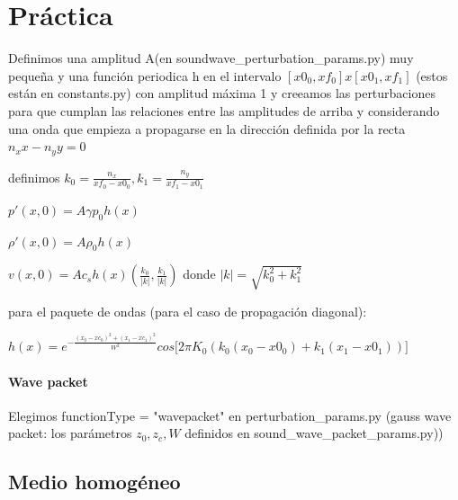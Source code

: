 \documentclass{article}
\begin{document}
\section{Práctica}
\begin{description}
\item Definimos una amplitud A(en soundwave\_perturbation\_params.py) muy pequeña y una función periodica h en el intervalo $[x0_0, xf_0] x [x0_1, xf_1]$ (estos están en constants.py) con amplitud máxima 1 y creeamos las perturbaciones para que cumplan las relaciones entre las amplitudes de arriba y considerando una onda que empieza a propagarse en la dirección definida por la recta $n_x x - n_y y = 0$
\item definimos $ k_0 = \frac{n_x}{xf_0 - x0_0}, k_1 =  \frac{n_y}{xf_1 - x0_1}$ 
\item  $p\prime(x,0) = A \gamma p_0 h(x) $ 
\item  $\rho\prime(x,0) = A \rho_0 h(x) $
\item  $v(x, 0) =  A c_s h(x) (\frac{k_0}{|k|} , \frac{k_1}{|k|}) $ donde $|k| = \sqrt{k_0^2 + k_1^2} $
\item para el paquete de ondas (para el caso de propagación diagonal):
\begin{center}
\item $h(x) = e^{- \frac{(x_0-xc_0)^2 + (x_1 - xc_1)^2 }{W^2}} cos\big[2 \pi  K_0 (k_0(x_0 - x0_0) +  k_1(x_1 - x0_1)) \big] $
\end{center}
\end{description}

\paragraph{Wave packet} Elegimos functionType = "wavepacket" en perturbation\_params.py  (gauss wave packet: los parámetros $z_0,z_c,W$ definidos en sound\_wave\_packet\_params.py))

\subsection{Medio homogéneo}
\end{document}
